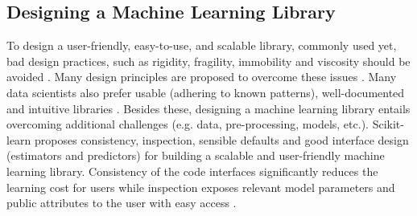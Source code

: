 \documentclass[letterpaper]{article} %
\begin{document}
\subsection{Designing a Machine Learning Library}

To design a user-friendly, easy-to-use, and scalable library, commonly used yet, bad design practices, such as rigidity, fragility, immobility and viscosity should be avoided \cite{martin2000design,piccioni2013empirical}.
Many design principles are proposed to overcome these issues \cite{gamma1995design}. Many data scientists also prefer usable (adhering to known patterns), well-documented and intuitive libraries \cite{nadi2023selecting}.
Besides these, designing a machine learning library entails overcoming additional challenges (e.g. data, pre-processing, models, etc.).
Scikit-learn \cite{pedregosa2011scikit} proposes consistency, inspection, sensible defaults and good interface design (estimators and predictors) for building a scalable and user-friendly machine learning library. Consistency of the code interfaces significantly reduces the learning cost for users while inspection exposes relevant model parameters and public attributes to the user with easy access \cite{buitinck2013api}.
\end{document}

